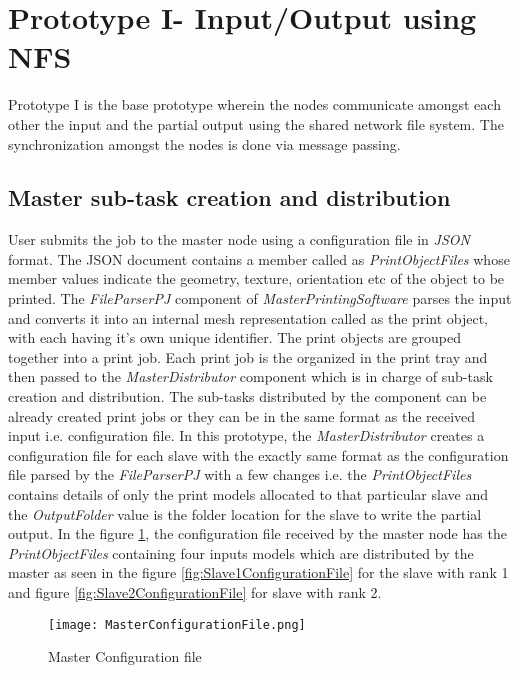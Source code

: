 \section{Prototype I- Input/Output using NFS }

Prototype I is the base prototype wherein the nodes communicate amongst each other the input and the partial output using the shared network file system. The synchronization amongst the nodes is done via message passing. 

\subsection{Master sub-task creation and distribution}
User submits the job to the master node using a configuration file in \textit{JSON} format. The JSON document contains a member called as \textit{PrintObjectFiles} whose member values indicate the geometry, texture, orientation etc of the object to be printed. The \textit{FileParserPJ} component of \textit{MasterPrintingSoftware} parses the input and converts it into an internal mesh representation called as the print object, with each having it's own unique identifier. The print objects are grouped together into a print job. Each print job is the organized in the print tray and then passed to the \textit{MasterDistributor} component which is in charge of sub-task creation and distribution. The sub-tasks distributed by the component can be already created print jobs or they can be in the same format as the received input i.e. configuration file. In this prototype, the \textit{MasterDistributor} creates a configuration file for each slave with the exactly same format as the configuration file parsed by the \textit{FileParserPJ} with a few changes i.e. the \textit{PrintObjectFiles} contains details of only the print models allocated to that particular slave and the \textit{OutputFolder} value is the folder location for the slave to write the partial output. In the figure \ref{fig:MasterConfigurationFile}, the configuration file received by the master node has the \textit{PrintObjectFiles} containing four inputs models which are distributed by the master as seen in the figure \ref{fig:Slave1ConfigurationFile} for the slave with rank 1 and figure \ref{fig:Slave2ConfigurationFile} for slave with rank 2. 

\begin{figure}[ht!]
\centering
\texttt{[image: MasterConfigurationFile.png]}
\caption{Master Configuration file}
\label{fig:MasterConfigurationFile}
\end{figure}

